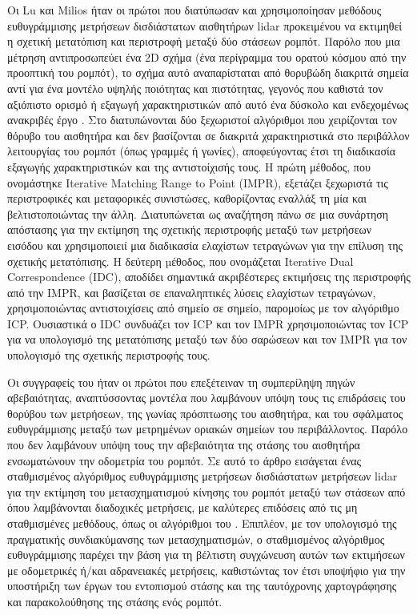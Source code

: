 Οι Lu και Milios ήταν οι πρώτοι που διατύπωσαν και χρησιμοποίησαν μεθόδους
ευθυγράμμισης μετρήσεων δισδιάστατων αισθητήρων lidar προκειμένου να εκτιμηθεί
η σχετική μετατόπιση και περιστροφή μεταξύ δύο στάσεων ρομπότ. Παρόλο που μια
μέτρηση αντιπροσωπεύει ένα 2D σχήμα (ένα περίγραμμα του ορατού κόσμου από την
προοπτική του ρομπότ), το σχήμα αυτό αναπαρίσταται από θορυβώδη διακριτά σημεία
αντί για ένα μοντέλο υψηλής ποιότητας και πιστότητας, γεγονός που καθιστά τον
αξιόπιστο ορισμό ή εξαγωγή χαρακτηριστικών από αυτό ένα δύσκολο και ενδεχομένως
ανακριβές έργο \cite{Grimson}. Στο \cite{FengLu1994a} διατυπώνονται δύο
ξεχωριστοί αλγόριθμοι που χειρίζονται τον θόρυβο του αισθητήρα και δεν
βασίζονται σε διακριτά χαρακτηριστικά στο περιβάλλον λειτουργίας του ρομπότ
(όπως γραμμές ή γωνίες), αποφεύγοντας έτσι τη διαδικασία εξαγωγής
χαρακτηριστικών και της αντιστοίχισής τους. Η πρώτη μέθοδος, που ονομάστηκε
Iterative Matching Range to Point (IMPR), εξετάζει ξεχωριστά τις περιστροφικές
και μεταφορικές συνιστώσες, καθορίζοντας εναλλάξ τη μία και βελτιστοποιώντας
την άλλη. Διατυπώνεται ως αναζήτηση πάνω σε μια συνάρτηση απόστασης για την
εκτίμηση της σχετικής περιστροφής μεταξύ των μετρήσεων εισόδου και
χρησιμοποιειί μια διαδικασία ελαχίστων τετραγώνων για την επίλυση της σχετικής
μετατόπισης. Η δεύτερη µέθοδος, που ονοµάζεται Iterative Dual Correspondence
(IDC), αποδίδει σημαντικά ακριβέστερες εκτιμήσεις της περιστροφής από την IMPR,
και βασίζεται σε επαναληπτικές λύσεις ελαχίστων τετραγώνων, χρησιμοποιώντας
αντιστοιχίσεις από σημείο σε σημείο, παρομοίως με τον αλγόριθμο ICP. Ουσιαστικά
ο IDC συνδυάζει τον ICP και τον IMPR χρησιμοποιώντας τον ICP για να υπολογισμό
της μετατόπισης μεταξύ των δύο σαρώσεων και τον IMPR για τον υπολογισμό της
σχετικής περιστροφής τους.

Οι συγγραφείς του \cite{Pfistera} ήταν οι πρώτοι που επεξέτειναν τη συμπερίληψη
πηγών αβεβαιότητας, αναπτύσσοντας μοντέλα που λαμβάνουν υπόψη τους τις
επιδράσεις του θορύβου των μετρήσεων, της γωνίας πρόσπτωσης του αισθητήρα, και
του σφάλματος ευθυγράμμισης μεταξύ των μετρημένων οριακών σημείων του
περιβάλλοντος. Παρόλο που δεν λαμβάνουν υπόψη τους την αβεβαιότητα της στάσης
του αισθητήρα ενσωματώνουν την οδομετρία του ρομπότ. Σε αυτό το άρθρο εισάγεται
ένας σταθμισμένος αλγόριθμος ευθυγράμμισης μετρήσεων δισδιάστατων μετρήσεων
lidar για την εκτίμηση του μετασχηματισμού κίνησης του ρομπότ μεταξύ των
στάσεων από όπου λαμβάνονται διαδοχικές μετρήσεις, με καλύτερες επιδόσεις από
τις μη σταθμισμένες μεθόδους, όπως οι αλγόριθμοι του \cite{FengLu1994a}.
Επιπλέον, με τον υπολογισμό της πραγματικής συνδιακύμανσης των μετασχηματισμών,
ο σταθμισμένος αλγόριθμος ευθυγράμμισης παρέχει την βάση για τη βέλτιστη
συγχώνευση αυτών των εκτιμήσεων με οδομετρικές ή/και αδρανειακές μετρήσεις,
καθιστώντας τον έτσι υποψήφιο για την υποστήριξη των έργων του εντοπισμού
στάσης και της ταυτόχρονης χαρτογράφησης και παρακολούθησης της στάσης ενός
ρομπότ.

